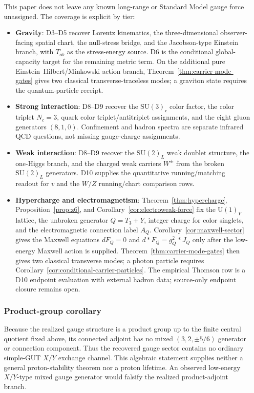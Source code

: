 \documentclass[11pt]{article}
\newcommand{\SU}{\mathrm{SU}}
\newcommand{\U}{\mathrm{U}}
\begin{document}
This paper does not leave any known long-range or Standard Model gauge force unassigned. The coverage is explicit by tier:
\begin{itemize}[leftmargin=2em]
\item \textbf{Gravity}: D3--D5 recover Lorentz kinematics, the three-dimensional observer-facing spatial chart, the null-stress bridge, and the Jacobson-type Einstein branch, with \(T_{ab}\) as the stress-energy source. D6 is the conditional global-capacity target for the remaining metric term. On the additional pure Einstein--Hilbert/Minkowski action branch, Theorem~\ref{thm:carrier-mode-gates} gives two classical transverse-traceless modes; a graviton state requires the quantum-particle receipt.
\item \textbf{Strong interaction}: D8--D9 recover the \(\SU(3)_c\) color factor, the color triplet \(N_c=3\), quark color triplet/antitriplet assignments, and the eight gluon generators \((8,1,0)\). Confinement and hadron spectra are separate infrared QCD questions, not missing gauge-charge assignments.
\item \textbf{Weak interaction}: D8--D9 recover the \(\SU(2)_L\) weak doublet structure, the one-Higgs branch, and the charged weak carriers \(W^\pm\) from the broken \(\SU(2)_L\) generators. D10 supplies the quantitative running/matching readout for \(v\) and the \(W/Z\) running/chart comparison rows.
\item \textbf{Hypercharge and electromagnetism}: Theorem~\ref{thm:hypercharge}, Proposition~\ref{prop:z6}, and Corollary~\ref{cor:electroweak-force} fix the \(\U(1)_Y\) lattice, the unbroken generator \(Q=T_3+Y\), integer charge for color singlets, and the electromagnetic connection label \(A_Q\). Corollary~\ref{cor:maxwell-sector} gives the Maxwell equations \(dF_Q=0\) and \(d*F_Q=g_Q^2*J_Q\) only after the low-energy Maxwell action is supplied. Theorem~\ref{thm:carrier-mode-gates} then gives two classical transverse modes; a photon particle requires Corollary~\ref{cor:conditional-carrier-particles}. The empirical Thomson row is a D10 endpoint evaluation with external hadron data; source-only endpoint closure remains open.
\end{itemize}

\subsubsection{Product-group corollary}

Because the realized gauge structure is a product group up to the finite
central quotient fixed above, its connected adjoint has no mixed
\((3,2,\pm5/6)\) generator or connection component. Thus the recovered gauge
sector contains no ordinary simple-GUT \(X/Y\) exchange channel. This
algebraic statement supplies neither a general proton-stability theorem nor a
proton lifetime. An observed low-energy \(X/Y\)-type mixed gauge generator
would falsify the realized product-adjoint branch.
\end{document}
